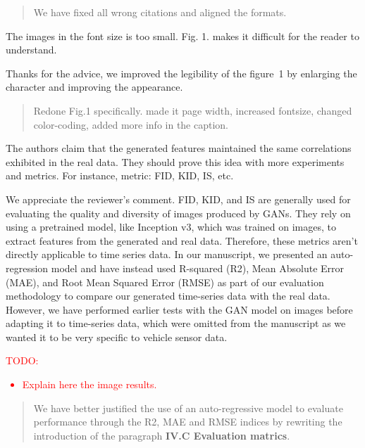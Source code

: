 \documentclass{article}
\begin{document}
\begin{quote}
	We have fixed all wrong citations and aligned the formats.
\end{quote}

\RC The images in the font size is too small. Fig. 1. makes it difficult for the reader to understand.

\AR Thanks for the advice, we improved the legibility of the figure~1 by enlarging the character and improving the appearance.

\begin{quote}
    Redone Fig.1 specifically. made it page width, increased fontsize, changed color-coding, added more info in the caption.
\end{quote}

\RC The authors claim that the generated features maintained the same correlations exhibited in the real data. They should prove this idea with more experiments and metrics. For instance, metric: FID, KID, IS, etc.

\AR We appreciate the reviewer's comment. FID, KID, and IS are generally used for evaluating the quality and diversity of images produced by GANs. They rely on using a pretrained model, like Inception v3, which was trained on images, to extract features from the generated and real data. Therefore, these metrics aren't directly applicable to time series data. In our manuscript, we presented an auto-regression model and have instead used R-squared (R2), Mean Absolute Error (MAE), and Root Mean Squared Error (RMSE) as part of our evaluation methodology to compare our generated time-series data with the real data. However, we have performed earlier tests with the GAN model on images before adapting it to time-series data, which were omitted from the manuscript as we wanted it to be very specific to vehicle sensor data.

\textcolor{red}{
TODO: 
\begin{itemize}
    \item Explain here the image results.
\end{itemize}
}

\begin{quote}
We have better justified the use of an auto-regressive model to evaluate performance through the R2, MAE and RMSE indices by rewriting the introduction of the paragraph \textbf{IV.C Evaluation matrics}.
\end{quote}
\end{document}
